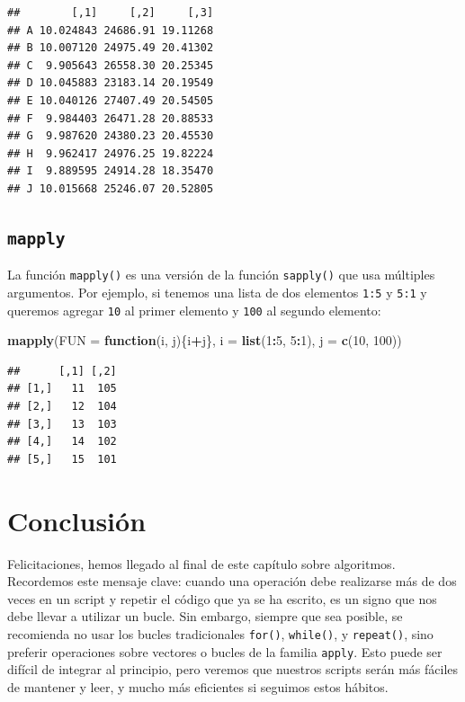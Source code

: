 \documentclass[
]{book}
\newenvironment{Shaded}{\begin{snugshade}}{\end{snugshade}}
\newcommand{\ControlFlowTok}[1]{\textcolor[rgb]{0.13,0.29,0.53}{\textbf{#1}}}
\newcommand{\DataTypeTok}[1]{\textcolor[rgb]{0.13,0.29,0.53}{#1}}
\newcommand{\DecValTok}[1]{\textcolor[rgb]{0.00,0.00,0.81}{#1}}
\newcommand{\KeywordTok}[1]{\textcolor[rgb]{0.13,0.29,0.53}{\textbf{#1}}}
\newcommand{\NormalTok}[1]{#1}
\newcommand{\OperatorTok}[1]{\textcolor[rgb]{0.81,0.36,0.00}{\textbf{#1}}}
\begin{document}
\begin{verbatim}
##        [,1]     [,2]     [,3]
## A 10.024843 24686.91 19.11268
## B 10.007120 24975.49 20.41302
## C  9.905643 26558.30 20.25345
## D 10.045883 23183.14 20.19549
## E 10.040126 27407.49 20.54505
## F  9.984403 26471.28 20.88533
## G  9.987620 24380.23 20.45530
## H  9.962417 24976.25 19.82224
## I  9.889595 24914.28 18.35470
## J 10.015668 25246.07 20.52805
\end{verbatim}

\hypertarget{l17mapply}{%
\subsection{\texorpdfstring{\texttt{mapply}}{mapply}}\label{l17mapply}}

La función \texttt{mapply()} es una versión de la función \texttt{sapply()} que usa múltiples argumentos. Por ejemplo, si tenemos una lista de dos elementos \texttt{1:5} y \texttt{5:1} y queremos agregar \texttt{10} al primer elemento y \texttt{100} al segundo elemento:

\begin{Shaded}
\begin{Highlighting}[]
\KeywordTok{mapply}\NormalTok{(}\DataTypeTok{FUN =} \ControlFlowTok{function}\NormalTok{(i, j)\{i}\OperatorTok{+}\NormalTok{j\}, }\DataTypeTok{i =} \KeywordTok{list}\NormalTok{(}\DecValTok{1}\OperatorTok{:}\DecValTok{5}\NormalTok{, }\DecValTok{5}\OperatorTok{:}\DecValTok{1}\NormalTok{), }\DataTypeTok{j =} \KeywordTok{c}\NormalTok{(}\DecValTok{10}\NormalTok{, }\DecValTok{100}\NormalTok{))}
\end{Highlighting}
\end{Shaded}

\begin{verbatim}
##      [,1] [,2]
## [1,]   11  105
## [2,]   12  104
## [3,]   13  103
## [4,]   14  102
## [5,]   15  101
\end{verbatim}

\hypertarget{conclusiuxf3n-6}{%
\section{Conclusión}\label{conclusiuxf3n-6}}

Felicitaciones, hemos llegado al final de este capítulo sobre algoritmos. Recordemos este mensaje clave: cuando una operación debe realizarse más de dos veces en un script y repetir el código que ya se ha escrito, es un signo que nos debe llevar a utilizar un bucle. Sin embargo, siempre que sea posible, se recomienda no usar los bucles tradicionales \texttt{for()}, \texttt{while()}, y \texttt{repeat()}, sino preferir operaciones sobre vectores o bucles de la familia \texttt{apply}. Esto puede ser difícil de integrar al principio, pero veremos que nuestros scripts serán más fáciles de mantener y leer, y mucho más eficientes si seguimos estos hábitos.
\end{document}
